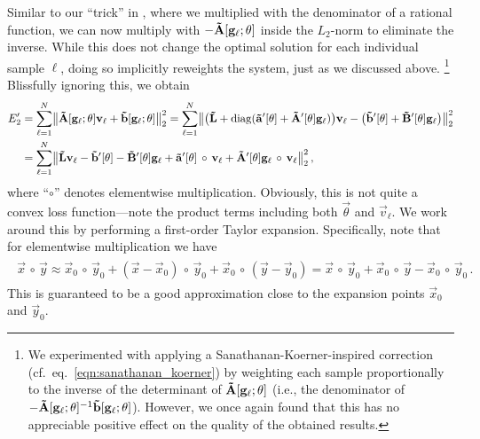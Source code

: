 
Similar to our \enquote{trick} in , where we multiplied with the denominator of a rational function, we can now multiply with $-\mathbf{\tilde A}[\mathbf{g}_\ell; \mathbf{\theta}]$ inside the $L_2$-norm to eliminate the inverse.
While this does not change the optimal solution for each individual sample $\ell$, doing so implicitly reweights the system, just as we discussed above.%
\footnote{We experimented with applying a Sanathanan-Koerner-inspired correction (cf.~eq.~\ref{eqn:sanathanan_koerner}) by weighting each sample proportionally to the inverse of the determinant of $\mathbf{\tilde A}[\mathbf{g}_\ell; \mathbf{\theta}]$ (i.e., the denominator of $-\mathbf{\tilde A}[\mathbf{g}_\ell; \mathbf{\theta}]^{-1} \mathbf{\tilde b}[\mathbf{g}_\ell; \mathbf{\theta}]$).
However, we once again found that this has no appreciable positive effect on the quality of the obtained results.}
Blissfully ignoring this, we obtain
\begin{align*}
	E_2' &= \sum_{\ell = 1}^N \bigl\| \mathbf{\tilde A}[\mathbf{g}_\ell; \mathbf{\theta}] \mathbf{v}_\ell + \mathbf{\tilde b}[\mathbf{g}_\ell; \mathbf{\theta}] \bigr\|_2^2
	   = \sum_{\ell = 1}^N
	   \bigl\|
	   \bigl(\mathbf{\tilde L} + \operatorname{\mathrm{diag}}(\mathbf{\tilde a}'[\mathbf{\theta}] + \mathbf{\tilde A}'[\mathbf{\theta}] \mathbf{g}_\ell) \bigr) \mathbf{v}_\ell -
	  	  	        \bigl(\mathbf{\tilde b}'[\mathbf{\theta}] + \mathbf{\tilde B}'[\mathbf{\theta}] \mathbf{g}_\ell  \bigr)
	  \bigr\|_2^2 \\
	  &= \sum_{\ell = 1}^N
	  	   \bigl\|
	  	     \mathbf{\tilde L} \mathbf{v}_\ell
	  	   - \mathbf{\tilde b}'[\mathbf{\theta}] 
	  	   - \mathbf{\tilde B}'[\mathbf{\theta}] \mathbf{g}_\ell
	  	   + \mathbf{\tilde a}'[\mathbf{\theta}] \, \circ \, \mathbf{v}_\ell
	  	   + \mathbf{\tilde A}'[\mathbf{\theta}] \mathbf{g}_\ell \, \circ \, \mathbf{v}_\ell
 	  \bigr\|_2^2 \,,
\end{align*}
where \enquote{$\circ$} denotes elementwise multiplication.
Obviously, this is not quite a convex loss function---note the product terms including both $\vec \theta$ and $\vec v_\ell$. We work around this by performing a first-order Taylor expansion.
Specifically, note that for elementwise multiplication we have
\begin{align}
	\begin{aligned}
	\vec x \, \circ \, \vec y
	\approx \vec x_0 \, \circ \, \vec y_0 + (\vec x - \vec x_0) \, \circ \, \vec y_0 + \vec x_0 \, \circ \, (\vec y - \vec y_0)
	= \vec x \, \circ \, \vec y_0 + \vec x_0 \, \circ \, \vec y - \vec x_0 \, \circ \, \vec y_0 \,.
	\end{aligned}
	\label{eqn:nlif_e21}
\end{align}
This is guaranteed to be a good approximation close to the expansion points $\vec x_0$ and $\vec y_0$.

